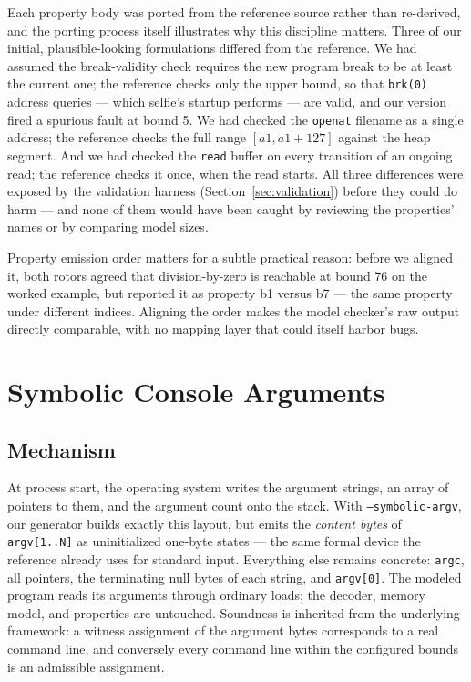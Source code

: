 \documentclass[sigplan,screen,nonacm]{acmart}
\begin{document}
Each property body was ported from the reference source rather than
re-derived, and the porting process itself illustrates why this
discipline matters. Three of our initial, plausible-looking
formulations differed from the reference. We had assumed the
break-validity check requires the new program break to be at least the
current one; the reference checks only the upper bound, so that
\texttt{brk(0)} address queries --- which selfie's startup performs ---
are valid, and our version fired a spurious fault at bound 5. We had
checked the \texttt{openat} filename as a single address; the reference
checks the full range $[\mathit{a1}, \mathit{a1}+127]$ against the heap
segment. And we had checked the \texttt{read} buffer on every
transition of an ongoing read; the reference checks it once, when the
read starts. All three differences were exposed by the validation
harness (Section~\ref{sec:validation}) before they could do harm ---
and none of them would have been caught by reviewing the properties'
names or by comparing model sizes.

Property emission order matters for a subtle practical reason: before
we aligned it, both rotors agreed that division-by-zero is reachable at
bound 76 on the worked example, but reported it as property b1 versus
b7 --- the same property under different indices. Aligning the order
makes the model checker's raw output directly comparable, with no
mapping layer that could itself harbor bugs.

\section{Symbolic Console Arguments}
\label{sec:argv}

\subsection{Mechanism}

At process start, the operating system writes the argument strings, an
array of pointers to them, and the argument count onto the stack. With
\texttt{--symbolic-argv}, our generator builds exactly this layout, but
emits the \emph{content bytes} of \texttt{argv[1..N]} as uninitialized
one-byte states --- the same formal device the reference already uses
for standard input. Everything else remains concrete: \texttt{argc},
all pointers, the terminating null bytes of each string, and
\texttt{argv[0]}. The modeled program reads its arguments through
ordinary loads; the decoder, memory model, and properties are untouched.
Soundness is inherited from the underlying framework: a witness
assignment of the argument bytes corresponds to a real command line,
and conversely every command line within the configured bounds is an
admissible assignment.
\end{document}
